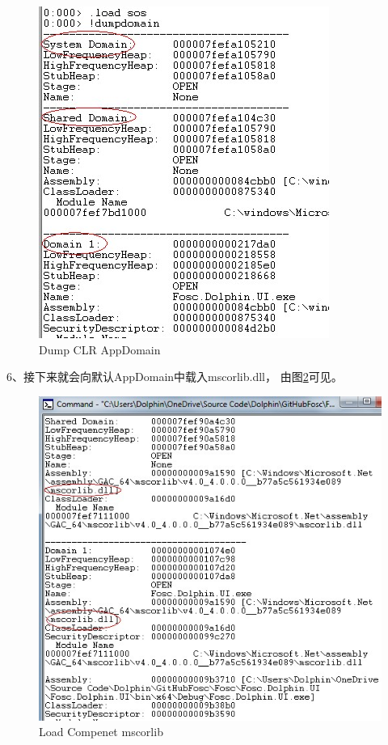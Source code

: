 \documentclass{book}
\begin{document}
\begin{figure}[htbp]
	\centering
	\includegraphics[scale=0.6]{CLRAppdomainDump.jpg}
	\caption{Dump CLR AppDomain}
	\label{fig:CLRAppdomainDump}
\end{figure}

6、接下来就会向默认AppDomain中载入mscorlib.dll，
由图\ref{fig:CLRMscoreLoad}可见。

\begin{figure}[htbp]
	\centering
	\includegraphics[scale=0.6]{CLRMscoreLoad.jpg}
	\caption{Load Compenet mscorlib}
	\label{fig:CLRMscoreLoad}
\end{figure}
\end{document}
